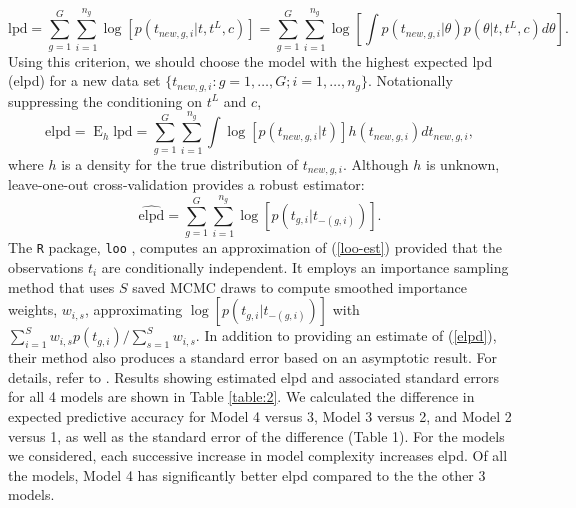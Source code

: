 \documentclass[aap]{imsart}
\newcommand{\op}{\operatorname}
\begin{document}
\begin{equation}
\mbox{lpd} = \sum_{g=1}^G \sum_{i=1}^{n_g} \log[p(t_{new,g,i}|t, t^L, c)] = \sum_{g=1}^G \sum_{i=1}^{n_g} \log \left[ \int p(t_{new,g, i}|\theta) p(\theta|t,t^L,c) d\theta \right].
\end{equation}
\noindent Using this criterion, we should choose the model with the highest expected lpd (elpd) for a new data set $\{t_{new,g,i}:g=1,\ldots,G; i=1,\ldots,n_g\}$. Notationally suppressing the conditioning on $t^L$ and $c$,
\begin{equation}
\mbox{elpd} = \op{E}_h \mbox{lpd} = \sum_{g=1}^G \sum_{i=1}^{n_g} \int \log [p(t_{new, g, i}|t)] h(t_{new,g,i}) d t_{new,g,i},
\label{elpd}
\end{equation}
where $h$ is a density for the true distribution of $t_{new,g,i}$. Although $h$ is unknown, leave-one-out cross-validation provides a robust estimator:
\begin{equation}
\widehat{\text{elpd}} = \sum_{g=1}^G \sum_{i=1}^{n_g} \log [p(t_{g,i}|t_{-(g,i)})].
\label{loo-est}
\end{equation}
The \texttt{R} package, \texttt{loo} \citep{loo}, computes an approximation of (\ref{loo-est}) provided that the observations $t_i$ are conditionally independent. It employs an importance sampling method that uses $S$ saved MCMC draws to compute smoothed importance weights, $w_{i,s}$, approximating $\log [p(t_{g,i}|t_{-(g,i)})]$ with $\sum_{i=1}^S w_{i,s} p(t_{g,i})/\sum_{s=1}^S w_{i,s}$. In addition to providing an estimate of (\ref{elpd}), their method also produces a standard error based on an asymptotic result. For details, refer to \cite{vehtari}.
Results showing estimated elpd and associated standard errors for all 4 models are shown in Table \ref{table:2}.
 We calculated the difference in expected predictive accuracy for Model 4 versus 3, Model 3 versus 2, and Model 2 versus 1, as well as the standard error of the difference (Table 1). For the models we considered, each successive increase in model complexity increases elpd.  Of all the models, Model 4 has significantly better elpd compared to the the other 3 models.
\end{document}
